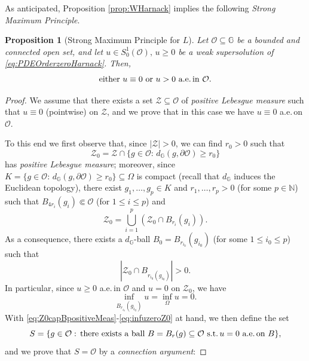 \documentclass[11pt]{amsart}
\numberwithin{equation}{section} %
\newtheorem{prop}[teo]{Proposition}
\theoremstyle{definition}
\begin{document}
As anticipated, Proposition \ref{prop:WHarnack} implies the following \emph{Strong Maximum Principle}.
\begin{prop}[Strong Maximum Principle for $L$] \label{prop:SMP}
 Let $\mathcal{O}\subseteq \mathbb{G}$ be a \emph{bounded and connected} 
 open set, and let
 $u\in S^1_0(\mathcal{O}),\,u\geq 0$ be a \emph{weak supersolution} of \eqref{eq:PDEOrderzeroHarnack}. 
 Then,
 \begin{equation} \label{eq:SMPConclusion}
  \text{either $u \equiv 0$ or $u > 0$ a.e.\,in $\mathcal{O}$}.
 \end{equation}
\end{prop}
\begin{proof} 
 We assume that there exists a set $\mathcal{Z}\subseteq\mathcal{O}$ of \emph{positive Lebesgue measure} such that $u \equiv 0$ (pointwise) on $\mathcal{Z}$, and we prove that in this case we have $u\equiv 0$ a.e.\,on $
\mathcal{O}$.
\vspace{0.1cm}

To this end we first observe that, since $|\mathcal{Z}| > 0$, we can find $r_0 > 0$ such that
$$\mathcal{Z}_0 = \mathcal{Z}\cap \{g\in\mathcal{O}:\,d_\mathbb{G}(g,\partial\mathcal{O}) \geq r_0\}$$
 has \emph{positive Lebesgue measure}; moreover, since $K = \{g\in\mathcal{O}:\,d_\mathbb{G}(g,\partial\mathcal{O}) \geq r_0\}\subseteq\Omega$
 is  com\-pact (recall that $d_\mathbb{G}$ induces 
 the Euclidean topology), there exist $g_1,\ldots,g_p\in K$ and $r_1,\ldots,r_p > 0$ (for some $p\in\mathbb{N}$) such that $B_{4r_i}(g_i)\Subset\mathcal{O}$ (for $1\leq i\leq p$) and
 $$\mathcal{Z}_0 = \bigcup_{i = 1}^p (\mathcal{Z}_0\cap B_{r_i}(g_i)).$$
 As a consequence, there exists a $d_\mathbb{G}$-ball $B_0 = B_{r_{i_0}}(g_{i_0})$
 (for some $1\leq i_0\leq p$) such that
 \begin{equation} \label{eq:Z0capBpositiveMeas}
  |\mathcal{Z}_0\cap B_{r_{i_0}(g_{i_0})}| > 0.
 \end{equation}	
 In particular, since $u\geq 0$ a.e.\,in $\mathcal{O}$ and $u = 0$ on $\mathcal{Z}_0$, we have
 \begin{equation} \label{eq:infuzeroZ0}
 	\inf_{B_{r_{i_0}}(g_{i_0})} u = \inf_{\Omega}u = 0.
 \end{equation}
 With \eqref{eq:Z0capBpositiveMeas}-\eqref{eq:infuzeroZ0}
at hand, we then define the set
 $$S = \{g\in\mathcal{O}:\,\text{there exists a ball 
 $B = B_r(g)\subseteq\mathcal{O}$ 
 s.t.\,$u = 0$ a.e.\,on $B$}\},$$
 and we prove that $S = \mathcal{O}$ by a \emph{connection argument}:
  \vspace{0.1cm}
 

\end{proof}
\end{document}
